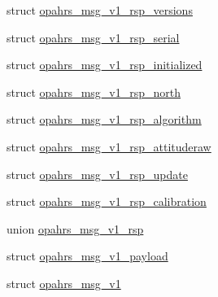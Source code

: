 \begin{DoxyCompactItemize}
\item 
struct \hyperlink{structopahrs__msg__v1__rsp__versions}{opahrs\-\_\-msg\-\_\-v1\-\_\-rsp\-\_\-versions}
\item 
struct \hyperlink{structopahrs__msg__v1__rsp__serial}{opahrs\-\_\-msg\-\_\-v1\-\_\-rsp\-\_\-serial}
\item 
struct \hyperlink{structopahrs__msg__v1__rsp__initialized}{opahrs\-\_\-msg\-\_\-v1\-\_\-rsp\-\_\-initialized}
\item 
struct \hyperlink{structopahrs__msg__v1__rsp__north}{opahrs\-\_\-msg\-\_\-v1\-\_\-rsp\-\_\-north}
\item 
struct \hyperlink{structopahrs__msg__v1__rsp__algorithm}{opahrs\-\_\-msg\-\_\-v1\-\_\-rsp\-\_\-algorithm}
\item 
struct \hyperlink{structopahrs__msg__v1__rsp__attituderaw}{opahrs\-\_\-msg\-\_\-v1\-\_\-rsp\-\_\-attituderaw}
\item 
struct \hyperlink{structopahrs__msg__v1__rsp__update}{opahrs\-\_\-msg\-\_\-v1\-\_\-rsp\-\_\-update}
\item 
struct \hyperlink{structopahrs__msg__v1__rsp__calibration}{opahrs\-\_\-msg\-\_\-v1\-\_\-rsp\-\_\-calibration}
\item 
union \hyperlink{unionopahrs__msg__v1__rsp}{opahrs\-\_\-msg\-\_\-v1\-\_\-rsp}
\item 
struct \hyperlink{structopahrs__msg__v1__payload}{opahrs\-\_\-msg\-\_\-v1\-\_\-payload}
\item 
struct \hyperlink{structopahrs__msg__v1}{opahrs\-\_\-msg\-\_\-v1}
\end{DoxyCompactItemize}
